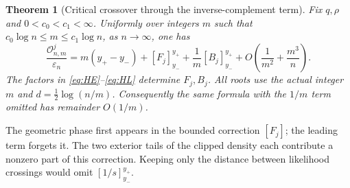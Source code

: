 \documentclass[11pt,oneside]{article}
\newtheorem{theorem}{Theorem}[section]
\theoremstyle{remark}\newtheorem{remark}[theorem]{Remark}
\newcommand{\eps}{\varepsilon}
\newcommand{\OO}{\mathcal O}
\numberwithin{equation}{section}
\begin{document}
\begin{theorem}[Critical crossover through the inverse-complement term]
\label{thm:main}
Fix $q,\rho$ and $0<c_0<c_1<\infty$. Uniformly over integers $m$ such that
$c_0\log n\le m\le c_1\log n$, as $n\to\infty$, one has
\begin{equation}
 \frac{\OO^j_{n,m}}{\eps_n}
 =m(y_+-y_-)+[F_j]_{y_-}^{y_+}
       +\frac1m[B_j]_{y_-}^{y_+}
       +O\!\left(\frac1{m^2}+\frac{m^3}{n}\right).
 \label{eq:main}
\end{equation}
The factors in \eqref{eq:HE}--\eqref{eq:HL} determine $F_j,B_j$.
All roots use the actual integer $m$ and $d=\frac12\log(n/m)$.
Consequently the same formula with the $1/m$ term omitted has
remainder $O(1/m)$.
\end{theorem}

The geometric phase first appears in the bounded correction $[F_j]$;
the leading term forgets it. The two exterior tails of the clipped density
each contribute a nonzero part of this correction. Keeping only the
distance between likelihood crossings would omit $[1/s]_{y_-}^{y_+}$.
\end{document}
